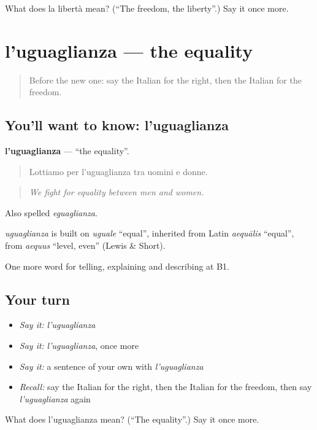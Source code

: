 \begin{tcolorbox}[breakable,colback=teal!4,colframe=teal!35!black,title={Before you move on}]
What does la libertà mean? (\textquotedblleft{}The freedom, the liberty\textquotedblright{}.) Say it once more.
\end{tcolorbox}
\section[l'uguaglianza]{l'uguaglianza — the equality}

\label{lesson:IT-C363-uguaglianza}



\begin{quote}
Before the new one: say the Italian for the right, then the Italian for the freedom.
\end{quote}

\subsection*{You'll want to know: l'uguaglianza}
\textbf{l'uguaglianza} — \textquotedblleft{}the equality\textquotedblright{}.

\begin{quote}
Lottiamo per l'uguaglianza tra uomini e donne.
\end{quote}

\begin{quote}
\emph{We fight for equality between men and women.}
\end{quote}

Also spelled \emph{eguaglianza}.

\begin{cousinweb}
\emph{uguaglianza} is built on \emph{uguale} \textquotedblleft{}equal\textquotedblright{}, inherited from Latin \emph{aequālis} \textquotedblleft{}equal\textquotedblright{}, from \emph{aequus} \textquotedblleft{}level, even\textquotedblright{} (Lewis \& Short).
\end{cousinweb}

\begin{grammarlens}[title={What you've built}]
One more word for telling, explaining and describing at B1.
\end{grammarlens}

\subsection*{Your turn}
\begin{itemize}
\raggedright
  \item \emph{Say it:} \emph{l'uguaglianza}
  \item \emph{Say it:} \emph{l'uguaglianza}, once more
  \item \emph{Say it:} a sentence of your own with \emph{l'uguaglianza}
  \item \emph{Recall:} say the Italian for the right, then the Italian for the freedom, then say \emph{l'uguaglianza} again
\end{itemize}

\begin{tcolorbox}[breakable,colback=teal!4,colframe=teal!35!black,title={Before you move on}]
What does l'uguaglianza mean? (\textquotedblleft{}The equality\textquotedblright{}.) Say it once more.
\end{tcolorbox}
